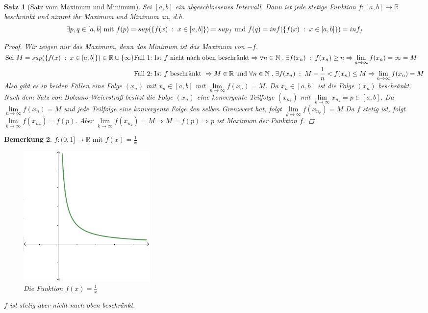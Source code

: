\documentclass[a4paper,titlepage,oneside]{article}
\def\N{\ensuremath{\mathbb{N}} }
\def\R{\ensuremath{\mathbb{R}} }
\def\sp{\hspace{0,1cm}}
\def\spdot{\sp.\sp}
\def\spcolon{\sp:\sp}
\renewcommand{\liminf}[2][n]{\ensuremath{\lim\limits_{#1 \rightarrow \infty}{#2}}}
\newcommand{\menge}[2]{\ensuremath{\left\{#1\sp : \sp #2\right\}}}
\theoremstyle{thmstyle}
\newtheorem{satz}{Satz}[section]
\newtheorem{bem}[satz]{Bemerkung}
\theoremstyle{subthmstyle}
\begin{document}
\begin{satz}[Satz vom Maximum und Minimum]
Sei $[a,b]$ ein abgeschlossenes Intervall. Dann ist jede stetige Funktion $f: [a,b] \to \R$ beschränkt und nimmt ihr Maximum und Minimum an, d.h.
\[\exists p,q \in [a,b] \text{ mit } f(p) = sup(\menge{f(x)}{x\in[a,b]}) = sup_f \text{ und } f(q) = inf(\menge{f(x)}{x\in[a,b]}) = inf_f\]

\begin{proof}
Wir zeigen nur das Maximum, denn das Minimum ist das Maximum von $-f$.\\
\begin{math}\displaystyle 
\text{Sei } M = sup(\menge{f(x)}{x\in[a,b]}) \in \R \cup \{\infty\} \\
 \begin{aligned}[t] \text{Fall 1:}&\text{ Ist $f$ nicht nach oben beschränkt} \Rightarrow \forall n \in \N \spdot \exists f(x_n) \spcolon f(x_n) \ge n \Rightarrow \liminf{f(x_n)} = \infty = M \\
\text{Fall 2:}&\text{ Ist $f$ beschränkt } \Rightarrow M \in \R \text{ und } \forall n \in \N \spdot \exists f(x_n) \spcolon M-\frac{1}{n} < f(x_n) \le M \Rightarrow \liminf{f(x_n)} = M 
\end{aligned}\\  \vphantom{\frac{1}{2}} \end{math}
Also gibt es in beiden Fällen eine Folge $(x_n)$ mit $x_n \in [a,b]$ mit $\liminf{f(x_n)} = M$. Da $x_n \in [a,b]$ ist die Folge $(x_n)$ beschränkt. Nach dem Satz von Bolzano-Weierstraß besitzt die Folge $(x_n)$ eine konvergente Teilfolge $(x_{n_k})$ mit $ \displaystyle \liminf[k]{x_{n_k}} = p \in [a,b] $. Da $\liminf{f(x_n)} = M$ und jede Teilfolge eine konvergente Folge den selben Grenzwert hat, folgt $ \displaystyle \liminf[k]{f(x_{n_k})} = M $ Da $f$ stetig ist, folgt $ \displaystyle \liminf[k]{f(x_{n_k})} = f(p) $. Aber $ \displaystyle \liminf[k]{f(x_{n_k})} = M \Rightarrow M = f(p) \Rightarrow p $ ist Maximum der Funktion $f$.
\end{proof}
\end{satz}

\begin{bem}
$f:(0,1] \to \R \text{ mit } f(x) = \frac{1}{x}$ \\
\begin{figure}[ht]\centering
 \includegraphics[width=0.33\textwidth]{images/funktion_1durchx.png}
\caption{Die Funktion $f(x) = \frac{1}{x}$}
\end{figure}
$f$ ist stetig aber nicht nach oben beschränkt.
\end{bem}
\end{document}
